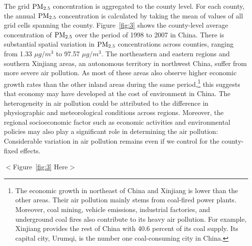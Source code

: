\documentclass[12pt]{article}
\begin{document}
    The grid $\rm PM_{2.5}$ concentration is aggregated to the county level. For each county, the annual $\rm PM_{2.5}$ concentration is calculated by taking the mean of values of all grid cells spanning the county. Figure~\ref{fig:3} shows the county-level average concentration of $\rm PM_{2.5}$
over the period of 1998 to 2007 in China. There is substantial spatial
variation in $\rm PM_{2.5}$ concentrations across counties, ranging from
 1.33 $\mu g/m^{3}$ to 97.57 $\mu
g/m^{3}$. The northeastern and eastern regions and southern Xinjiang areas, an autonomous territory in northwest China, suffer from more severe air pollution. As most of these areas also observe higher economic growth rates than the other inland areas during the same period,\footnote{The economic growth in northeast of China and Xinjiang is lower than the other areas. Their air pollution mainly stems from coal-fired power plants. Moreover, coal mining, vehicle emissions, industrial factories, and underground coal fires also contribute to its heavy air pollution. For example, Xinjiang provides the rest of China with 40.6 percent of its coal supply. Its capital city, Urumqi, is the number one coal-consuming city in China.} this suggests that economy may have developed at the cost of environment in China. The heterogeneity in air pollution could be attributed to the difference in physiographic and meteorological conditions across regions. Moreover, the regional socioeconomic factor such as economic activities and environmental policies may also play a significant role in determining the air pollution: Considerable variation in air pollution remains even if we control for the county-fixed effects.

\begin{center}
  $<$Figure~\ref{fig:3} Here$>$
  \end{center}
\end{document}
